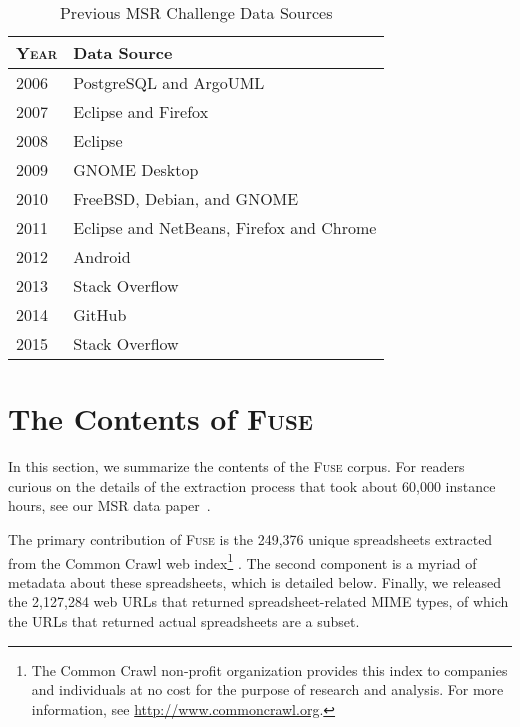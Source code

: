 \documentclass[conference]{IEEEtran}
\newcommand{\urlcount}{2,127,284}
\newcommand{\xlscount}{249,376}
\begin{document}
\begin{table}[!t]
\caption{Previous MSR Challenge Data Sources\label{tab:datasources}}
\centering
\begin{tabular}{ll}
\toprule
\textbf{\textsc{Year}} & \textbf{Data Source}\\
\midrule
2006 & PostgreSQL and ArgoUML\\
2007 & Eclipse and Firefox\\
2008 & Eclipse\\
2009 & GNOME Desktop\\
2010 & FreeBSD, Debian, and GNOME\\
2011 & Eclipse and NetBeans, Firefox and Chrome\\
2012 & Android\\
2013 & Stack Overflow\\
2014 & GitHub\\
2015 & Stack Overflow\\
\bottomrule
\end{tabular}
\end{table}



\section{The Contents of \textsc{Fuse}}

In this section, we summarize the contents of the \textsc{Fuse} corpus.
For readers curious on the details of the extraction process that took about 60,000 instance hours, see our MSR data paper~\cite{barik2015}.

The primary contribution of \textsc{Fuse} is the \xlscount{} unique spreadsheets extracted from the Common Crawl web index\footnote{The Common Crawl non-profit organization provides this index to companies and individuals at no cost for the purpose of research and analysis. For more information, see \url{http://www.commoncrawl.org}.} .
The second component is a myriad of metadata about these spreadsheets, which is detailed below.
Finally, we released the \urlcount{} web URLs that returned spreadsheet-related MIME types, of which the URLs that returned actual spreadsheets are a subset.
\end{document}

